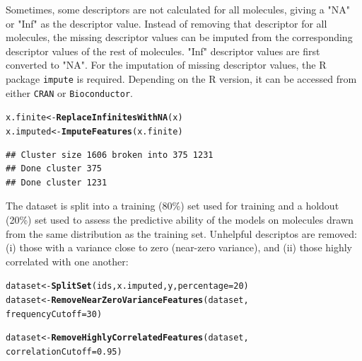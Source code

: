 \documentclass[twoside,a4wide,12pt]{article}\usepackage[]{graphicx}\usepackage[]{color}
\makeatletter
\newcommand{\hlnum}[1]{\textcolor[rgb]{0.686,0.059,0.569}{#1}}%
\newcommand{\hlstd}[1]{\textcolor[rgb]{0.345,0.345,0.345}{#1}}%
\newcommand{\hlkwb}[1]{\textcolor[rgb]{0.69,0.353,0.396}{#1}}%
\newcommand{\hlkwc}[1]{\textcolor[rgb]{0.333,0.667,0.333}{#1}}%
\newcommand{\hlkwd}[1]{\textcolor[rgb]{0.737,0.353,0.396}{\textbf{#1}}}%
\newenvironment{kframe}{%
 \def\at@end@of@kframe{}%
 \ifinner\ifhmode%
  \def\at@end@of@kframe{\end{minipage}}%
  \begin{minipage}{\columnwidth}%
 \fi\fi%
 \def\FrameCommand##1{\hskip\@totalleftmargin \hskip-\fboxsep
 \colorbox{shadecolor}{##1}\hskip-\fboxsep
     \hskip-\linewidth \hskip-\@totalleftmargin \hskip\columnwidth}%
 \MakeFramed {\advance\hsize-\width
   \@totalleftmargin\z@ \linewidth\hsize
   \@setminipage}}%
 {\par\unskip\endMakeFramed%
 \at@end@of@kframe}
\newenvironment{knitrout}{}{} %
\makeatother
\begin{document}
Sometimes, some descriptors are not calculated for all molecules, giving a "NA" or "Inf" as the descriptor value. 
Instead of removing that descriptor for all molecules, the missing descriptor values can be imputed from the corresponding descriptor values of the rest of molecules.
"Inf" descriptor values are first converted to "NA".
For the imputation of missing descriptor values, the R package  \texttt{impute} is required.
Depending on the R version, it can be accessed from either \texttt{CRAN} or \texttt{Bioconductor}.
\begin{knitrout}
\color{fgcolor}\begin{kframe}
\begin{alltt}
\hlstd{x.finite} \hlkwb{<-} \hlkwd{ReplaceInfinitesWithNA}\hlstd{(x)}
\hlstd{x.imputed} \hlkwb{<-} \hlkwd{ImputeFeatures}\hlstd{(x.finite)}
\end{alltt}


{\ttfamily\noindent\itshape\color{messagecolor}{\#\# Loading required package: impute}}\begin{verbatim}
## Cluster size 1606 broken into 375 1231 
## Done cluster 375 
## Done cluster 1231
\end{verbatim}
\end{kframe}
\end{knitrout}

The dataset is split into a training (80\%) set used for training and a holdout (20\%) set used to assess the predictive ability of the models on molecules drawn from the same distribution as the training set. Unhelpful descriptos are removed: (i) those with a variance close to zero (near-zero variance), and (ii) those highly correlated with one another:
\begin{knitrout}
\color{fgcolor}\begin{kframe}
\begin{alltt}
\hlstd{dataset} \hlkwb{<-} \hlkwd{SplitSet}\hlstd{(ids, x.imputed, y,} \hlkwc{percentage} \hlstd{=} \hlnum{20}\hlstd{)}
\hlstd{dataset} \hlkwb{<-} \hlkwd{RemoveNearZeroVarianceFeatures}\hlstd{(dataset,}
    \hlkwc{frequencyCutoff} \hlstd{=} \hlnum{30}\hlstd{)}
\end{alltt}


{\ttfamily\noindent\itshape\color{messagecolor}{\#\# 397 features removed with variance below cutoff}}\begin{alltt}
\hlstd{dataset} \hlkwb{<-} \hlkwd{RemoveHighlyCorrelatedFeatures}\hlstd{(dataset,}
    \hlkwc{correlationCutoff} \hlstd{=} \hlnum{0.95}\hlstd{)}
\end{alltt}


{\ttfamily\noindent\itshape\color{messagecolor}{\#\# 121 features removed with correlation above cutoff}}\end{kframe}
\end{knitrout}
\end{document}
